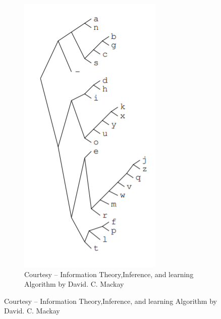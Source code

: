 \documentclass{article}
\begin{document}
\begin{figure}[ht]
\begin{subfigure}{.38\textwidth}
  \includegraphics[width=1.1\linewidth]{P2.png}
  \caption{Courtesy – Information Theory,Inference, and learning Algorithm by David. C. Mackay }
  \label{fig:sub2}
\end{subfigure}
\end{figure}
\end{document}
